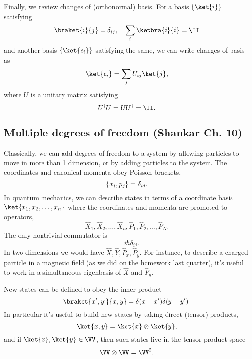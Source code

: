 Finally, we review changes of (orthonormal) basis. For a basis $\set{\ket{i}}$ satisfying
\begin{equation}
    \braket{i}{j}= \delta_{ij}, \quad \sum_i \ketbra{i}{i} = \II
\end{equation}
and another basis $\set{\ket{e_i}}$ satisfying the same, we can write changes of basis as
\begin{equation}
    \ket{e_i} = \sum_j U_{ij} \ket{j},
\end{equation}
where $U$ is a unitary matrix satisfying
\begin{equation}
    U^\dagger U = UU^\dagger =\II.
\end{equation}

\subsection*{Multiple degrees of freedom (Shankar Ch. 10)}
Classically, we can add degrees of freedom to a system by allowing particles to move in more than 1 dimension, or by adding particles to the system. The coordinates and canonical momenta obey Poisson brackets,
\begin{equation}
    \{x_i,p_j\}=\delta_{ij}.
\end{equation}
In quantum mechanics, we can describe states in terms of a coordinate basis $\ket{x_1,x_2,\ldots,x_n}$ where the coordinates and momenta are promoted to operators,
\begin{equation}
    \hat X_1, \hat X_2, \ldots, \hat X_n, \hat P_1, \hat P_2, \ldots, \hat P_N.
\end{equation}
The only nontrivial commutator is
\begin{equation}
    [\hat X_i,\hat P_j] = i\hbar \delta_{ij}.
\end{equation}
In two dimensions we would have $\hat X, \hat Y, \hat P_x,\hat P_y$. For instance, to describe a charged particle in a magnetic field (as we did on the homework last quarter), it's useful to work in a simultaneous eigenbasis of $\hat X$ and $\hat P_y$.

New states can be defined to obey the inner product
\begin{equation}
    \braket{x',y'}{x,y}=\delta(x-x')\delta(y-y').
\end{equation}
In particular it's useful to build new states by taking direct (tensor) products,
\begin{equation}
    \ket{x,y} = \ket{x} \otimes \ket{y},
\end{equation}
and if $\ket{x},\ket{y} \in \VV$, then such states live in the tensor product space
\begin{equation}
    \VV \otimes \VV = \VV^2.
\end{equation}

